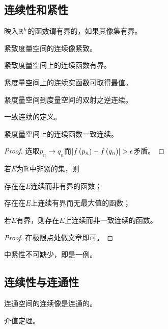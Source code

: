 \documentclass{ctexrep}
\begin{document}
  \subsection{连续性和紧性}
  \begin{definition}
    映入$\mathbb{R}^k$的函数谓有界的，如果其像集有界。
  \end{definition}
  \begin{theorem}
    紧致度量空间的连续像紧致。
  \end{theorem}
  \begin{theorem}
    紧致度量空间上的连续函数有界。
  \end{theorem}
  \begin{theorem}
    紧度量空间上的连续实函数可取得最值。
  \end{theorem}
  \begin{theorem}
    \label{thm:invofcompactcontin}
    紧度量空间到度量空间的双射之逆连续。
  \end{theorem}
  \begin{definition}
  一致连续的定义。
  \end{definition}
  \begin{definition}
    紧度量空间上的连续函数一致连续。
  \end{definition}
  \begin{proof}
    选取$p_n\rightarrow q_n$而$\abs{f\left(p_n\right)-f\left(q_n\right)}>\epsilon$矛盾。
  \end{proof}
  \begin{theorem}
    若$E$为$\mathbb{R}$中非紧的集，则
    \begin{cenum}
      \item 存在在$E$连续而非有界的函数；
      \item 存在在$E$上连续有界而无最大值的函数；
      \item 若$E$有界，则存在$E$上连续而非一致连续的函数。
    \end{cenum}
  \end{theorem}
  \begin{proof}
    在极限点处做文章即可。
  \end{proof}
  \begin{ex}
    中紧性不可缺少，即是一例。
  \end{ex}
  \subsection{连续性与连通性}
  \begin{theorem}
    连通空间的连续像是连通的。
  \end{theorem}
  \begin{theorem}
    介值定理。
  \end{theorem}
\end{document}
